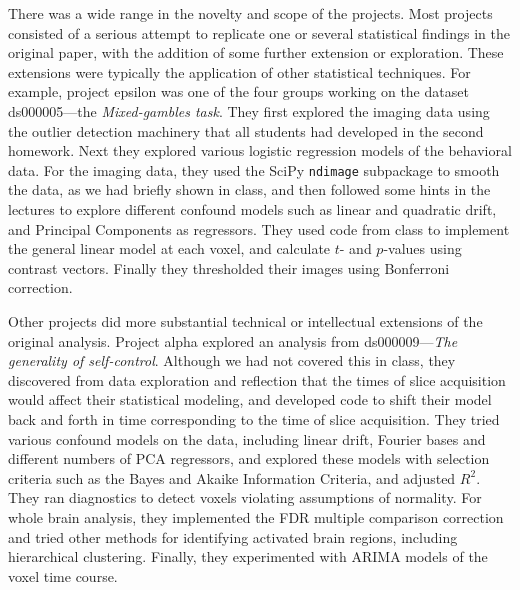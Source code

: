 There was a wide range in the novelty and scope of the projects.  Most
projects consisted of a serious attempt to replicate one or several
statistical findings in the original paper, with the addition of some further
extension or exploration.  These extensions were typically the application of
other statistical techniques.  For example, project epsilon was one of the
four groups working on the dataset ds000005---the \textit{Mixed-gambles
task}.  They first explored the imaging data using the outlier detection
machinery that all students had developed in the second homework.  Next they
explored various logistic regression models of the behavioral data.  For the
imaging data, they used the SciPy \texttt{ndimage} subpackage to smooth the
data, as we had briefly shown in class, and then followed some hints in the
lectures to explore different confound models such as linear and quadratic
drift, and Principal Components as regressors.  They used code
from class to implement the general linear model at each voxel, and calculate
$t$- and $p$-values using contrast vectors.  Finally they thresholded their images
using Bonferroni correction.

Other projects did more substantial technical or intellectual extensions of
the original analysis.  Project alpha explored an analysis from
ds000009---\textit{The generality of self-control}.  Although we had not covered this in
class, they discovered from data exploration and reflection that the times of
slice acquisition would affect their statistical modeling, and developed code
to shift their model back and forth in time corresponding to the time of slice
acquisition.  They tried various confound models on the data, including linear
drift, Fourier bases and different numbers of PCA regressors, and explored
these models with selection criteria such as the Bayes and Akaike Information
Criteria, and adjusted $R^2$.  They ran diagnostics to detect voxels violating
assumptions of normality. For whole brain analysis, they implemented the FDR
multiple comparison correction and tried other methods for identifying
activated brain regions, including hierarchical clustering.  Finally, they
experimented with ARIMA models of the voxel time course.


